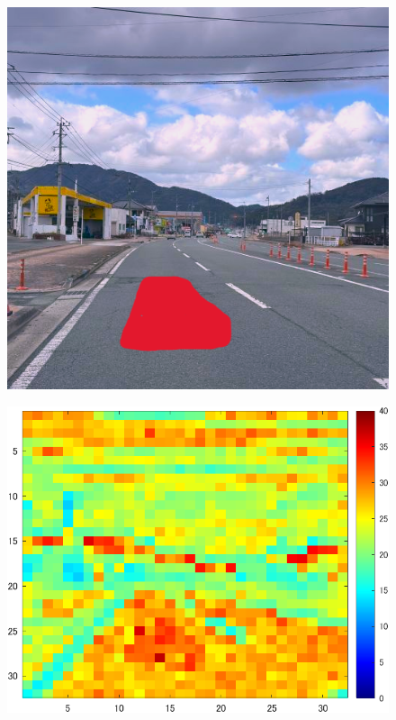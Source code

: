 \documentclass[paper]{ieicej}
\begin{document}
\begin{figure}[tb]
  \begin{minipage}[]{0.32\columnwidth}
    \centering
    \includegraphics[width=0.9\columnwidth]{figures/Ex_pr3.png}
    \label{fig:3-3-2}
  \end{minipage}
  \begin{minipage}[]{0.32\linewidth}
    \centering
    \includegraphics[width=0.9\columnwidth]{figures/Ex_re5.png}
    \label{fig:3-3-3}

\end{minipage}
\end{figure}
\end{document}
